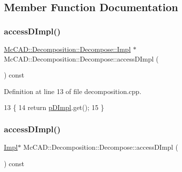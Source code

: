 \subsection{Member Function Documentation}
\mbox{\label{classMcCAD_1_1Decomposition_1_1Decompose_a45796aa043ed86a9c22fbc3028ef9bbe}} 
\subsubsection{\texorpdfstring{access\+D\+Impl()}{accessDImpl()}\hspace{0.1cm}{\footnotesize\ttfamily [1/2]}}
{\footnotesize\ttfamily \hyperlink{classMcCAD_1_1Decomposition_1_1Decompose_1_1Impl}{Mc\+C\+A\+D\+::\+Decomposition\+::\+Decompose\+::\+Impl} $\ast$ Mc\+C\+A\+D\+::\+Decomposition\+::\+Decompose\+::access\+D\+Impl (\begin{DoxyParamCaption}{ }\end{DoxyParamCaption}) const}



Definition at line 13 of file decomposition.\+cpp.


\begin{DoxyCode}
13                                               \{
14   \textcolor{keywordflow}{return} \hyperlink{classMcCAD_1_1Decomposition_1_1Decompose_aa39ced95c033a2a77e4fe2c60ad8427c}{pDImpl}.get();
15 \}
\end{DoxyCode}
\mbox{\label{classMcCAD_1_1Decomposition_1_1Decompose_a3ea80c57708a014f34aec5fdf7c97805}} 
\subsubsection{\texorpdfstring{access\+D\+Impl()}{accessDImpl()}\hspace{0.1cm}{\footnotesize\ttfamily [2/2]}}
{\footnotesize\ttfamily \hyperlink{classMcCAD_1_1Decomposition_1_1Decompose_1_1Impl}{Impl}$\ast$ Mc\+C\+A\+D\+::\+Decomposition\+::\+Decompose\+::access\+D\+Impl (\begin{DoxyParamCaption}{ }\end{DoxyParamCaption}) const}

